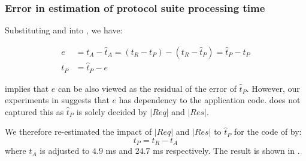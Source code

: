 \subsubsection{Error in estimation of protocol suite processing time}

Substituting  and  into , we have:

\begin{equation}\label{Eq: tP error}
	\begin{aligned}
		e &= t_A - \hat{t}_A = (t_R - t_P) - (t_R - \hat{t}_P) = \hat{t}_P - t_P\\
		t_P &= \hat{t}_P - e
	\end{aligned}
\end{equation}

 implies that $e$ can be also viewed as the residual of the error of $\hat{t}_P$. However, our experiments in  suggests that $e$ has dependency to the application code.  does not captured this as $\hat{t}_P$ is solely decided by $|Req|$ and $|Res|$. 

We therefore re-estimated the impact of $|Req|$ and $|Res|$ to $\hat{t}_P$ for the code of  by:
\begin{equation}
	t_P = t_R - t_A
\end{equation}
where $t_A$ is adjusted to $4.9$ ms and $24.7$ ms respectively. The result is shown in .

